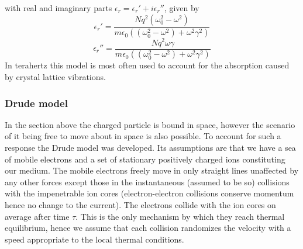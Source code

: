 with real and imaginary parts $\epsilon_r=\epsilon_r'+i\epsilon_r''$, given by
\begin{equation}
\epsilon_r'=\frac{Nq^2(\omega_0^2-\omega^2)}{m\epsilon_0((\omega_0^2-\omega^2)+\omega^2\gamma^2)}
\label{eq:epsilon real}
\end{equation}
\begin{equation}
\epsilon_r''=\frac{Nq^2\omega\gamma}{m\epsilon_0((\omega_0^2-\omega^2)+\omega^2\gamma^2)}
\label{eq:epsilon imaginary}
\end{equation}
In terahertz this model is most often used to account for the absorption caused by crystal lattice vibrations.


\subsubsection{Drude model}
\label{sec:Drude Model}
In the section above the charged particle is bound in space, however the scenario of it being free to move about in space is also possible. To account for such a response the Drude model was developed. Its assumptions are that we have a sea of mobile electrons and a set of stationary positively charged ions constituting our medium. The mobile electrons freely move in only straight lines unaffected by any other forces except those in the instantaneous (assumed to be so) collisions with the impenetrable ion cores (electron-electron collisions conserve momentum hence no change to the current). The electrons collide with the ion cores on average after time $\tau$. This is the only mechanism by which they reach thermal equilibrium, hence we assume that each collision randomizes the velocity with a speed appropriate to the local thermal conditions.


